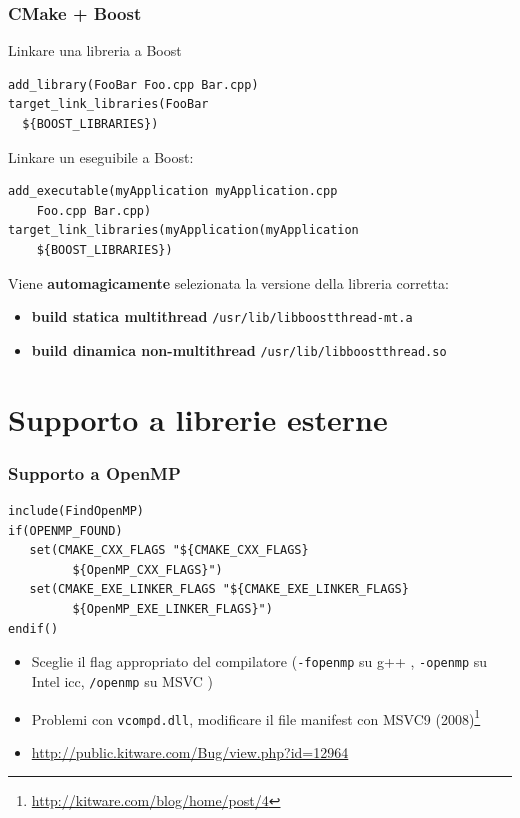 \documentclass[10pt] {beamer}
\begin{document}

\begin{frame}[fragile]
 \frametitle{CMake + Boost}
Linkare una libreria a Boost
\begin{verbatim}
add_library(FooBar Foo.cpp Bar.cpp)
target_link_libraries(FooBar 
  ${BOOST_LIBRARIES})
\end{verbatim}
Linkare un eseguibile a Boost:
\begin{verbatim}
add_executable(myApplication myApplication.cpp 
    Foo.cpp Bar.cpp)
target_link_libraries(myApplication(myApplication 
    ${BOOST_LIBRARIES})
\end{verbatim}
Viene \textbf{automagicamente} selezionata la versione della libreria corretta:
\begin{itemize}
\item \textbf{build statica multithread} \verb_/usr/lib/libboost_\verb_thread-mt.a_
\item \textbf{build dinamica non-multithread} \verb_/usr/lib/libboost_\verb_thread.so_
\end{itemize}
\end{frame}

\section{Supporto a librerie esterne}
\begin{frame}[fragile]
 \frametitle{Supporto a OpenMP}
\begin{footnotesize}
\begin{verbatim}
include(FindOpenMP)
if(OPENMP_FOUND)
   set(CMAKE_CXX_FLAGS "${CMAKE_CXX_FLAGS} 
         ${OpenMP_CXX_FLAGS}")
   set(CMAKE_EXE_LINKER_FLAGS "${CMAKE_EXE_LINKER_FLAGS} 
         ${OpenMP_EXE_LINKER_FLAGS}")
endif()
\end{verbatim}
\end{footnotesize}
\begin{itemize}
 \item Sceglie il flag appropriato del compilatore (\texttt{-fopenmp} su g++ , \texttt{-openmp} su Intel icc, \texttt{/openmp} su MSVC )
 \item Problemi con \texttt{vcompd.dll}, modificare il file manifest con MSVC9 (2008)\footnote{\url{http://kitware.com/blog/home/post/4}}
\item \url{http://public.kitware.com/Bug/view.php?id=12964}
\end{itemize}

\end{frame}
\end{document}
